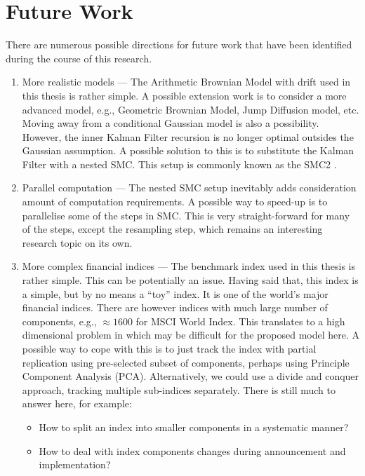 \section{Future Work}
There are numerous possible directions for future work that have been identified during the course of this research.
\begin{enumerate}
\item More realistic models --- The Arithmetic Brownian Model with drift used in this thesis is rather simple. A possible extension work is to consider a more advanced model, e.g., Geometric Brownian Model, Jump Diffusion model, etc. Moving away from a conditional Gaussian model is also a possibility. However, the inner Kalman Filter recursion is no longer optimal outsides the Gaussian assumption. A possible solution to this is to substitute the Kalman Filter with a nested SMC. This setup is commonly known as the SMC2 \cite{CN13}.

\item Parallel computation --- The nested SMC setup inevitably adds consideration amount of computation requirements. A possible way to speed-up is to parallelise some of the steps in SMC. This is very straight-forward for many of the steps, except the resampling step, which remains an interesting research topic on its own. 

\item More complex financial indices --- The benchmark index used in this thesis is rather simple. This can
be potentially an issue. Having said that, this index is a simple, but by no means a ``toy''
index. It is one of the world's major financial indices. There are however indices with much large number of components, e.g., $\approx 1600$ for MSCI World Index. This translates to a high dimensional problem in which may be difficult for the proposed model here. A possible way to cope with this is to just track the index with partial replication using pre-selected subset of components, perhaps using Principle Component Analysis (PCA). Alternatively, we could use a divide and conquer approach, tracking multiple sub-indices separately. There is still much to answer here, for example:
\begin{itemize}
\item How to split an index into smaller components in a systematic manner?
\item How to deal with index components changes during announcement and implementation?
\end{itemize}
\end{enumerate}
